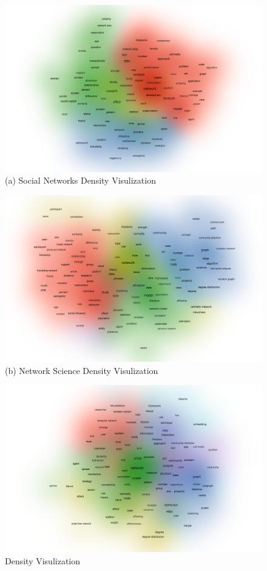 \documentclass[twocolumn]{article}
\begin{document}
		\begin{figure}
			\centering
			\caption{\label{fig.fig11}Density Visulization}
			\begin{minipage}[b]{0.32\textwidth}
				\centering
				\includegraphics[width=\linewidth]{Social Networks/VOS/co-word.pdf}
				(a) Social Networks Density Visulization
			\end{minipage}
			\begin{minipage}[b]{0.32\textwidth}
				\centering
				\includegraphics[width=\linewidth]{Network Science/VOS/co-word.pdf}
				(b) Network Science Density Visulization
			\end{minipage}
			\begin{minipage}[b]{0.32\textwidth}
				\centering
				\includegraphics[width=\linewidth]{Journal of Complex Networks/VOS/co-word.pdf}

\end{minipage}
\end{figure}
\end{document}
